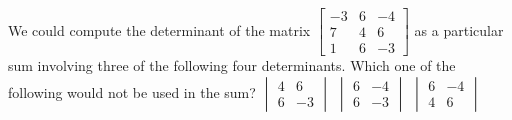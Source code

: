 \begin{activity}
We could compute the determinant of the matrix 
\(\begin{bmatrix} -3&6&-4
\\7&4&6
\\1&6&-3 \end{bmatrix}\)  
as a particular sum involving three of the following four determinants.  
Which one of the following would not be used in the sum?
{\(\begin{vmatrix} 4&6\\6&-3 \end{vmatrix}\)}
{\(\begin{vmatrix} 6&-4\\6&-3 \end{vmatrix}\)}
{\(\begin{vmatrix} 6&-4\\4&6 \end{vmatrix}\)}
\end{activity}




